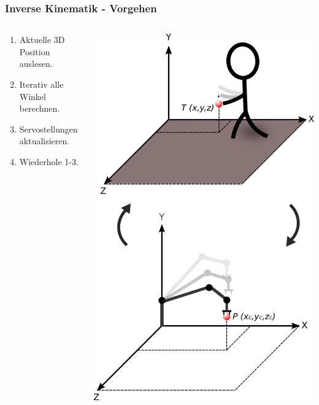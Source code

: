 \begin{frame}
\frametitle{Inverse Kinematik - Vorgehen}
\begin{columns}
\begin{column}{.48\textwidth}
\begin{enumerate}
\item Aktuelle 3D Position auslesen.
\item Iterativ alle Winkel berechnen.
\item Servostellungen aktualisieren.
\item Wiederhole 1-3.
\end{enumerate}
\end{column}%
\hfill%
\begin{column}{.48\textwidth}
\includegraphics[scale=0.248]{imgs/kinematikCycle.png}
\end{column}
\end{columns}
\end{frame}

